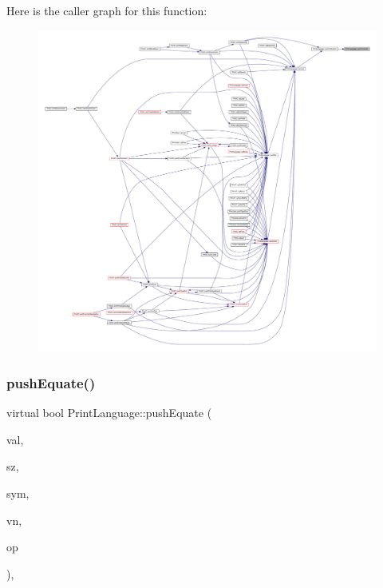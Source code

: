 Here is the caller graph for this function\+:
\nopagebreak
\begin{figure}[H]
\begin{center}
\leavevmode
\includegraphics[width=350pt]{class_print_language_a1ef3fe4265a8f0abdb72f90ce3cb9944_icgraph}
\end{center}
\end{figure}
\mbox{\label{class_print_language_ad90b2dc069614a6ad24ca8d73345ab74}} 
\subsubsection{\texorpdfstring{pushEquate()}{pushEquate()}}
{\footnotesize\ttfamily virtual bool Print\+Language\+::push\+Equate (\begin{DoxyParamCaption}\item[{\mbox{\hyperlink{types_8h_a2db313c5d32a12b01d26ac9b3bca178f}{uintb}}}]{val,  }\item[{int4}]{sz,  }\item[{const \mbox{\hyperlink{class_equate_symbol}{Equate\+Symbol}} $\ast$}]{sym,  }\item[{const \mbox{\hyperlink{class_varnode}{Varnode}} $\ast$}]{vn,  }\item[{const \mbox{\hyperlink{class_pcode_op}{Pcode\+Op}} $\ast$}]{op }\end{DoxyParamCaption})\hspace{0.3cm}{\ttfamily [protected]}, {}}




